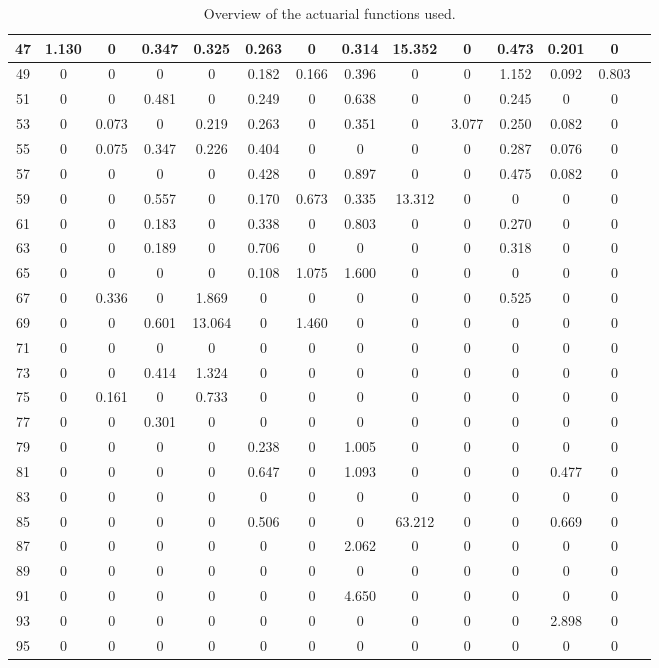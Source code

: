 \begin{table*}[htb]
\begin{tabular}{|c |c |c |c |c |c |c |c |c |c |c |c |c |c|}
47&1.130& 0& 0.347& 0.325& 0.263& 0& 0.314& 15.352& 0& 0.473& 0.201& 0\\\hline
49&0& 0& 0& 0& 0.182& 0.166& 0.396& 0& 0& 1.152& 0.092& 0.803\\\hline
51&0& 0& 0.481& 0& 0.249& 0& 0.638& 0& 0& 0.245& 0& 0\\\hline
53&0& 0.073& 0& 0.219& 0.263& 0& 0.351& 0& 3.077& 0.250& 0.082& 0\\\hline
55&0& 0.075& 0.347& 0.226& 0.404& 0& 0& 0& 0& 0.287& 0.076& 0\\\hline
57&0& 0& 0& 0& 0.428& 0& 0.897& 0& 0& 0.475& 0.082& 0\\\hline
59&0& 0& 0.557& 0& 0.170& 0.673& 0.335& 13.312& 0& 0& 0& 0\\\hline
61&0& 0& 0.183& 0& 0.338& 0& 0.803& 0& 0& 0.270& 0& 0\\\hline
63&0& 0& 0.189& 0& 0.706& 0& 0& 0& 0& 0.318& 0& 0\\\hline
65&0& 0& 0& 0& 0.108& 1.075& 1.600& 0& 0& 0& 0& 0\\\hline
67&0& 0.336& 0& 1.869& 0& 0& 0& 0& 0& 0.525& 0& 0\\\hline
69&0& 0& 0.601& 13.064& 0& 1.460& 0& 0& 0& 0& 0& 0\\\hline
71&0& 0& 0& 0& 0& 0& 0& 0& 0& 0& 0& 0\\\hline
73&0& 0& 0.414& 1.324& 0& 0& 0& 0& 0& 0& 0& 0\\\hline
75&0& 0.161& 0& 0.733& 0& 0& 0& 0& 0& 0& 0& 0\\\hline
77&0& 0& 0.301& 0& 0& 0& 0& 0& 0& 0& 0& 0\\\hline
79&0& 0& 0& 0& 0.238& 0& 1.005& 0& 0& 0& 0& 0\\\hline
81&0& 0& 0& 0& 0.647& 0& 1.093& 0& 0& 0& 0.477& 0\\\hline
83&0& 0& 0& 0& 0& 0& 0& 0& 0& 0& 0& 0\\\hline
85&0& 0& 0& 0& 0.506& 0& 0& 63.212& 0& 0& 0.669& 0\\\hline
87&0& 0& 0& 0& 0& 0& 2.062& 0& 0& 0& 0& 0\\\hline
89&0& 0& 0& 0& 0& 0& 0& 0& 0& 0& 0& 0\\\hline
91&0& 0& 0& 0& 0& 0& 4.650& 0& 0& 0& 0& 0\\\hline
93&0& 0& 0& 0& 0& 0& 0& 0& 0& 0& 2.898& 0\\\hline
95&0& 0& 0& 0& 0& 0& 0& 0& 0& 0& 0& 0\\\hline

    \end{tabular}
    \caption{Overview of the actuarial functions used.}
    \label{table:probabilityItems}
\end{table*}
    


